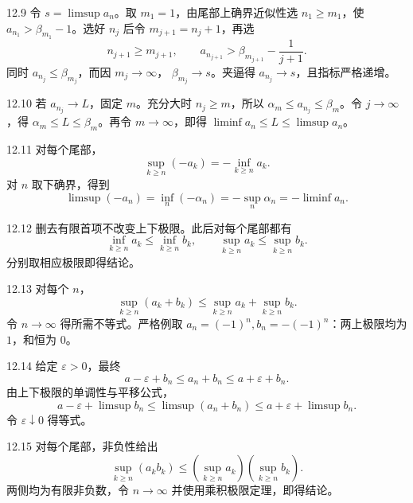 \begin{solution}{12.9}
令 \(s=\limsup a_n\)。取 \(m_1=1\)，由尾部上确界近似性选 \(n_1\ge m_1\)，使
\(a_{n_1}>\beta_{m_1}-1\)。选好 \(n_j\) 后令 \(m_{j+1}=n_j+1\)，再选
\[
 n_{j+1}\ge m_{j+1},\qquad
 a_{n_{j+1}}>\beta_{m_{j+1}}-\frac1{j+1}.
\]
同时 \(a_{n_j}\le\beta_{m_j}\)，而因 \(m_j\to\infty\)，
\(\beta_{m_j}\to s\)。夹逼得 \(a_{n_j}\to s\)，且指标严格递增。
\end{solution}

\begin{solution}{12.10}
若 \(a_{n_j}\to L\)，固定 \(m\)。充分大时 \(n_j\ge m\)，所以
\(\alpha_m\le a_{n_j}\le\beta_m\)。令 \(j\to\infty\)，得
\(\alpha_m\le L\le\beta_m\)。再令 \(m\to\infty\)，即得
\(\liminf a_n\le L\le\limsup a_n\)。
\end{solution}

\begin{solution}{12.11}
对每个尾部，
\[
 \sup_{k\ge n}(-a_k)=-\inf_{k\ge n}a_k.
\]
对 \(n\) 取下确界，得到
\[
 \limsup(-a_n)
 =\inf_n(-\alpha_n)
 =-\sup_n\alpha_n
 =-\liminf a_n.
\]
\end{solution}

\begin{solution}{12.12}
删去有限首项不改变上下极限。此后对每个尾部都有
\[
 \inf_{k\ge n}a_k\le\inf_{k\ge n}b_k,\qquad
 \sup_{k\ge n}a_k\le\sup_{k\ge n}b_k.
\]
分别取相应极限即得结论。
\end{solution}

\begin{solution}{12.13}
对每个 \(n\)，
\[
 \sup_{k\ge n}(a_k+b_k)
 \le \sup_{k\ge n}a_k+\sup_{k\ge n}b_k.
\]
令 \(n\to\infty\) 得所需不等式。严格例取
\(a_n=(-1)^n,b_n=-(-1)^n\)：两上极限均为 \(1\)，和恒为 \(0\)。
\end{solution}

\begin{solution}{12.14}
给定 \(\varepsilon>0\)，最终
\[
 a-\varepsilon+b_n\le a_n+b_n\le a+\varepsilon+b_n.
\]
由上下极限的单调性与平移公式，
\[
 a-\varepsilon+\limsup b_n
 \le\limsup(a_n+b_n)
 \le a+\varepsilon+\limsup b_n.
\]
令 \(\varepsilon\downarrow0\) 得等式。
\end{solution}

\begin{solution}{12.15}
对每个尾部，非负性给出
\[
 \sup_{k\ge n}(a_kb_k)
 \le\left(\sup_{k\ge n}a_k\right)
   \left(\sup_{k\ge n}b_k\right).
\]
两侧均为有限非负数，令 \(n\to\infty\) 并使用乘积极限定理，即得结论。
\end{solution}

